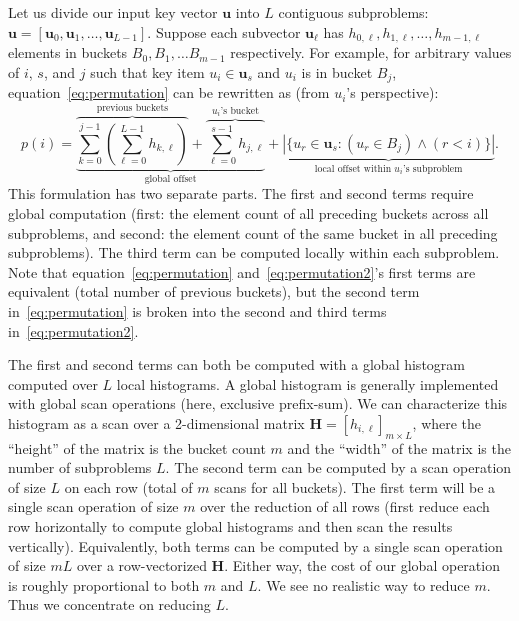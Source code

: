 Let us divide our input key vector $\mathbf{u}$ into $L$ contiguous subproblems: $\mathbf{u} = [\mathbf{u}_{0}, \mathbf{u}_{1}, \dots, \mathbf{u}_{L-1}]$. Suppose each subvector $\mathbf{u}_\ell$ has $h_{0,\ell}, h_{1,\ell}, \dots, h_{m-1,\ell}$ elements in buckets $B_0, B_1, \dots B_{m-1}$ respectively.
For example, for arbitrary values of $i$, $s$, and $j$ such that key item $u_i \in \mathbf{u}_s$ and $u_i$ is in bucket $B_j$, equation~\eqref{eq:permutation} can be rewritten as (from $u_i$'s perspective):
\begin{equation}\label{eq:permutation2}
p(i) = \underbrace{\overbrace{\sum_{k=0}^{j-1}\left(\sum_{\ell = 0}^{L-1}h_{k,\ell}\right)}^{\text{previous buckets}}+\overbrace{\sum_{\ell=0}^{s-1}h_{j,\ell}}^\text{$u_i$'s bucket}}_\text{global offset}
 + \underbrace{\left| \{u_r \in \mathbf{u}_s: (u_r \in B_j) \land (r < i)\}\right|}_{\text{local offset within $u_i$'s subproblem}}.
 \end{equation}
This formulation has two separate parts. The first and second terms require global computation (first: the element count of all preceding buckets across all subproblems, and second: the element count of the same bucket in all preceding subproblems). The third term can be computed locally within each subproblem. Note that equation~\eqref{eq:permutation} and~\eqref{eq:permutation2}'s first terms are equivalent (total number of previous buckets), but the second term in~\eqref{eq:permutation} is broken into the second and third terms in~\eqref{eq:permutation2}.

The first and second terms can both be computed with a global histogram computed over $L$ local histograms. A global histogram is generally implemented with global scan operations (here, exclusive prefix-sum). We can characterize this histogram as a scan over a 2-dimensional matrix  $\mathbf{H} = [h_{i,\ell}]_{m\times L}$, where the ``height'' of the matrix is the bucket count $m$ and the ``width'' of the matrix is the number of subproblems $L$\@.
The second term can be computed by a scan operation of size $L$ on each row (total of $m$ scans for all buckets). The first term will be a single scan operation of size $m$ over the reduction of all rows (first reduce each row horizontally to compute global histograms and then scan the results vertically). Equivalently, both terms can be computed by a single scan operation of size $mL$ over a row-vectorized $\mathbf{H}$.
Either way, the cost of our global operation is roughly proportional to both $m$ and $L$\@. We see no realistic way to reduce $m$. Thus we concentrate on reducing $L$\@.

